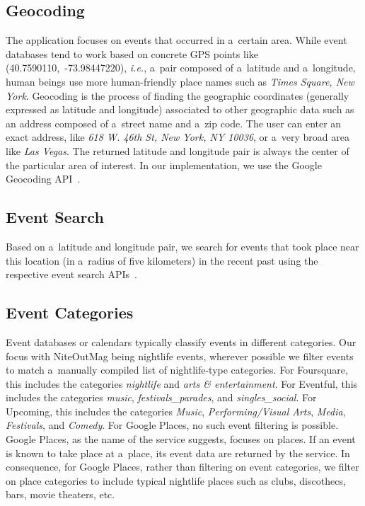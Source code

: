 \documentclass[runningheads,a4paper]{llncs}
\begin{document}
{\subsection{Geocoding}
The application focuses on events that occurred in a~certain area. While event databases tend to work based on concrete GPS points like
\mbox{(40.7590110, -73.98447220)}, \emph{i.e.}, a~pair composed of a~latitude and a~longitude, human beings use more human-friendly place names such as \emph{Times Square, New York}. Geocoding is the process of finding the geographic coordinates (generally expressed as latitude and longitude) associated to other geographic data such as an address composed of a~street name and a~zip code. The user can enter an exact address, like \emph{618 W. 46th St, New York, NY 10036}, or a~very broad area like \emph{Las Vegas}. The returned latitude and longitude pair is always the center of the particular area of interest. In our implementation, we use the Google Geocoding API~\cite{Geocoding2012}.

\subsection{Event Search}
Based on a~latitude and longitude pair, we search for events that took place near this location (in a~radius of five kilometers) in the recent past using the respective event search APIs~\cite{Eventful2012,Foursquare2012,GooglePlaces2012,Upcoming2012}.

\subsection{Event Categories}
Event databases or calendars typically classify events in different categories.
Our focus with NiteOutMag being nightlife events,
wherever possible we filter events to match
a~manually compiled list of nightlife-type categories.
For Foursquare, this includes the categories \emph{nightlife} and \emph{arts \& entertainment}.
For Eventful, this includes the categories \emph{music}, \emph{festivals\_parades}, and \emph{singles\_social}.
For Upcoming, this includes the categories \emph{Music}, \emph{Performing/Visual Arts}, \emph{Media}, \emph{Festivals}, and \emph{Comedy}.
For Google Places, no such event filtering is possible.
Google Places, as the name of the service suggests, focuses on places.
If an event is known to take place at a~place, its event data are returned by the service.
In consequence, for Google Places, rather than filtering on event categories,
we filter on place categories to include typical nightlife places
such as clubs, discothecs, bars, movie theaters, etc.

}
\end{document}
